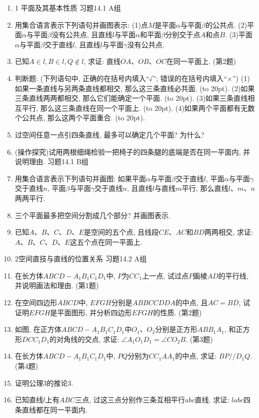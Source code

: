 \documentclass[10pt,a4paper]{article}
\newcommand{\bracket}[1]{(\hbox to #1pt{})}
\begin{document}
\begin{enumerate}[1.]

\item 1 平面及其基本性质
习题14.1 A组
\item 用集合语言表示下列语句并画图表示:
(1)点$M$是平面$\alpha$与平面$\beta$的公共点.
(2)平面$\alpha$与平面$\beta$没有公共点, 且直线$l$与平面$\alpha$和平面$\beta$分别交于点$A$和点$B$.
(3)平面$\alpha$与平面$\beta$交于直线$l$, 且直线$l$与平面$\gamma$没有公共点.
\item 已知$A\in l,B\in l,Q\notin l$, 求证: 直线$OA$、$OB$、$OC$在同一平面上.
(第2题)
\item 判断题: (下列语句中, 正确的在括号内填入``√''; 错误的在括号内填入``×'')
(1)如果一条直线与另两条直线都相交, 那么这三条直线必共面. \bracket{20}.
(2)如果三条直线两两都相交, 那么它们能确定一个平面. \bracket{20}.
(3)如果三条直线相互平行, 那么这三条直线在同一个平面上. \bracket{20}.
(4)如果两个平面都有无数个公共点, 那么这两个平面重合.   \bracket{20}.
\item 过空间任意一点引四条直线, 最多可以确定几个平面? 为什么?
\item (操作探究)试用两根细绳检验一把椅子的四条腿的底端是否在同一平面内, 并说明理由.
习题14.1 B组
\item 用集合语言表示下列语句并画图:
如果平面$\alpha$与平面$\beta$交于直线$l$, 平面$\alpha$与平面$\gamma$交于直线$n$, 平面$\beta$与平面$\gamma$交于直线$n$, 且直线$l$与直线$m$平行, 那么直线$l$、$m$、$n$两两平行.
\item 三个平面最多把空间分割成几个部分? 并画图表示.
\item 已知$A$、$B$、$C$、$D$、$E$是空间的五个点, 且线段$CE$、$AC$和$BD$两两相交, 求证: $A$、$B$、$C$、$D$、$E$这五个点在同一平面上.
\item 2空间直技与直线的位置关系
习题14.2 A组
\item 在长方体$ABCD-A_1B_1C_1D_1$中, $P$为$CC_1$上一点, 试过点$P$画棱$AD$的平行线, 并说明画法和理由.
(第1题)
\item 在空间四边形$ABCD$中, $EFGH$分别是$ABBCCDDA$的中点, 且$AC=BD$, 试证明$EFGH$是平面图形, 并分析四边形$EFGH$的性质.
(第2题)
\item 如图, 在正方体$ABCD-A_1B_1C_1D_1$中$O_1$、$O_2$分别是正方形$ABB_1A_1$, 和正方形$DCC_1D_1$的对角线的交点, 求证: $\angle A_1O_1D_1=\angle CO_2B$.
(第3题)
\item 在长方体$ABCD-A_1B_1C_1D_1$中, $PQ$分别为$CC_1AA_1$的中点, 求证: $BP//D_1Q$.
(第4题)
\item 证明公理3的推论3.
\item 已知直线$l$上有$ABC$三点, 过这三点分别作三条互相平行$abc$直线. 求证: $labc$四条直线都在同一平面内.

\end{enumerate}
\end{document}
